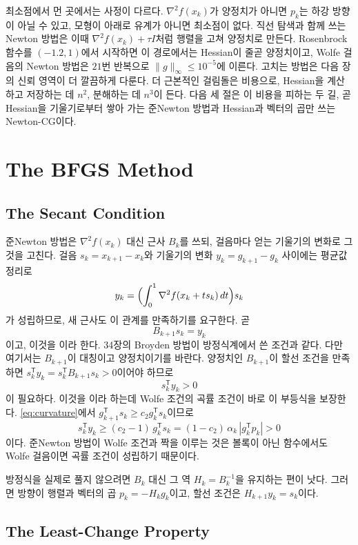 최소점에서 먼 곳에서는 사정이 다르다. $\nabla^2f(x_k)$가 양정치가 아니면 $p_k$는 하강 방향이 아닐 수 있고, 모형이 아래로 유계가 아니면 최소점이 없다. 직선 탐색과 함께 쓰는 Newton 방법은 이때 $\nabla^2f(x_k)+\tau I$처럼 행렬을 고쳐 양정치로 만든다. Rosenbrock 함수를 $(-1.2,1)$에서 시작하면 이 경로에서는 Hessian이 줄곧 양정치이고, Wolfe 걸음의 Newton 방법은 $21$번 반복으로 $\|g\|_\infty\le10^{-5}$에 이른다. 고치는 방법은 다음 장의 신뢰 영역이 더 깔끔하게 다룬다. 더 근본적인 걸림돌은 비용으로, Hessian을 계산하고 저장하는 데 $n^2$, 분해하는 데 $n^3$이 든다. 다음 세 절은 이 비용을 피하는 두 길, 곧 Hessian을 기울기로부터 쌓아 가는 준Newton 방법과 Hessian과 벡터의 곱만 쓰는 Newton-CG이다.

\section{The BFGS Method}
\label{sec:bfgs}

\subsection{The Secant Condition}

준Newton 방법은 $\nabla^2f(x_k)$ 대신 근사 $B_k$를 쓰되, 걸음마다 얻는 기울기의 변화로 그것을 고친다. 걸음 $s_k=x_{k+1}-x_k$와 기울기의 변화 $y_k=g_{k+1}-g_k$ 사이에는 평균값 정리로
\[
y_k=\Bigl(\int_0^1\nabla^2f(x_k+ts_k)\,dt\Bigr)s_k
\]
가 성립하므로, 새 근사도 이 관계를 만족하기를 요구한다. 곧
\[
B_{k+1}s_k=y_k
\]
이고, 이것을 이라 한다. 34장의 Broyden 방법이 방정식계에서 쓴 조건과 같다. 다만 여기서는 $B_{k+1}$이 대칭이고 양정치이기를 바란다. 양정치인 $B_{k+1}$이 할선 조건을 만족하면 $s_k^{\mathsf T}y_k=s_k^{\mathsf T}B_{k+1}s_k>0$이어야 하므로
\[
s_k^{\mathsf T}y_k>0
\]
이 필요하다. 이것을 이라 하는데 Wolfe 조건의 곡률 조건이 바로 이 부등식을 보장한다. \eqref{eq:curvature}에서 $g_{k+1}^{\mathsf T}s_k\ge c_2g_k^{\mathsf T}s_k$이므로
\[
s_k^{\mathsf T}y_k\ge(c_2-1)\,g_k^{\mathsf T}s_k=(1-c_2)\,\alpha_k\,|g_k^{\mathsf T}p_k|>0
\]
이다. 준Newton 방법이 Wolfe 조건과 짝을 이루는 것은 볼록이 아닌 함수에서도 Wolfe 걸음이면 곡률 조건이 성립하기 때문이다.

방정식을 실제로 풀지 않으려면 $B_k$ 대신 그 역 $H_k=B_k^{-1}$을 유지하는 편이 낫다. 그러면 방향이 행렬과 벡터의 곱 $p_k=-H_kg_k$이고, 할선 조건은 $H_{k+1}y_k=s_k$이다.

\subsection{The Least-Change Property}

